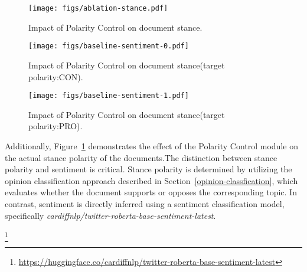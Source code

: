 \begin{figure}[]
  \centering
  \texttt{[image: figs/ablation-stance.pdf]}
  \caption{Impact of Polarity Control on document stance.}
  \label{ablation-stance}
\end{figure}

\begin{figure}[]
  \centering
  \texttt{[image: figs/baseline-sentiment-0.pdf]}
  \caption{Impact of Polarity Control on document stance(target polarity:CON).}
  \label{baseline-sentiment-0}
\end{figure}

\begin{figure}[]
  \centering
  \texttt{[image: figs/baseline-sentiment-1.pdf]}
  \caption{Impact of Polarity Control on document stance(target polarity:PRO).}
  \label{baseline-sentiment-1}
\end{figure}


Additionally, Figure~\ref{ablation-stance} demonstrates the effect of the Polarity Control module on the actual stance polarity of the documents.The distinction between stance polarity and sentiment is critical. Stance polarity is determined by utilizing the opinion classification approach described in Section~\ref{opinion-classfication}, which evaluates whether the document supports or opposes the corresponding topic. In contrast, sentiment is directly inferred using a sentiment classification model, specifically \textit{cardiffnlp/twitter-roberta-base-sentiment-latest}.



\footnote{\url{https://huggingface.co/cardiffnlp/twitter-roberta-base-sentiment-latest}}




